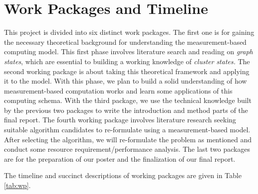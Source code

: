 \section{Work Packages and Timeline}

This project is divided into six distinct work packages. The first one is for gaining the necessary theoretical background for understanding the measurement-based computing model. This first phase involves literature search and reading on \emph{graph states}, which are essential to building a working knowledge of \emph{cluster states.} The second working package is about taking this theoretical framework and applying it to the model. With this phase, we plan to build a solid understanding of how measurement-based computation works and learn some applications of this computing schema. With the third package, we use the technical knowledge built by the previous two packages to write the introduction and method parts of the final report. The fourth working package involves literature research seeking suitable algorithm candidates to re-formulate using a measurement-based model. After selecting the algorithm, we will re-formulate the problem as mentioned and conduct some resource requirement/performance analysis. The last two packages are for the preparation of our poster and the finalization of our final report.

The timeline and succinct descriptions of working packages are given in Table \ref{tab:wp}.

